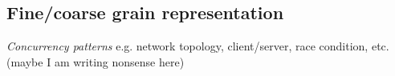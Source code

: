 %





%






\subsection{Fine/coarse grain representation}

{\em Concurrency patterns} e.g. network topology, client/server, race condition, etc. (maybe I am writing nonsense here)

